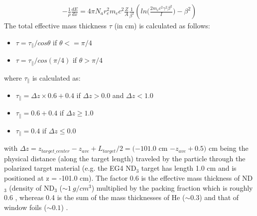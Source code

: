 \begin{eqnarray}
\label{eqBetheBlock}
-\frac{1}{\rho} \frac{dE}{dx} = 4\pi N_a r_e^2 m_e c^2 \frac{Z}{A} \frac{1}{\beta^2} \left( ln\bigg( \frac{2m_ec^2\gamma^2\beta^2}{I} \bigg) - \beta^2 \right) 
\end{eqnarray}
The total effective mass thickness $\tau$ (in cm) is calculated as follows: %
\begin{itemize}
\item $\tau = \tau_{\parallel}/cos\theta$ \quad if $\theta <= \pi/4$
\item $\tau = \tau_{\parallel}/cos(\pi/4)$ \quad if $\theta > \pi/4$    %
\end{itemize}
where $\tau_{\parallel}$ is calculated as:
\begin{itemize}
\item $\tau_{\parallel} = \Delta z \times 0.6 + 0.4$ \quad if $\Delta z > 0.0 $ and $\Delta z < 1.0 $
\item $\tau_{\parallel} = 0.6 + 0.4$ \quad if $\Delta z \geq  1.0$
\item $\tau_{\parallel} = 0.4$ \quad if $\Delta z \leq  0.0$
\end{itemize}
with $\Delta z = z_{target\_center} - z_{ave} + L_{target}/2 = (-101.0$ cm $ - z_{ave} + 0.5)$ cm being the physical distance (along the target length) traveled by the particle through the polarized target material (e.g. the EG4 ND$_3$ target has length 1.0 cm and is positioned at z = -101.0 cm). The factor 0.6 is the effective mass thickness of ND$_3$ (density of ND$_3$ ($\sim 1 ~g/cm^3$) %
multiplied by the packing fraction which is roughly 0.6  \cite{rferschAnaNote},%
whereas 0.4 is the sum of the mass thicknesses of He ($\sim 0.3$) and that of window foils ($\sim 0.1$) \cite{nGuler_th}. %


